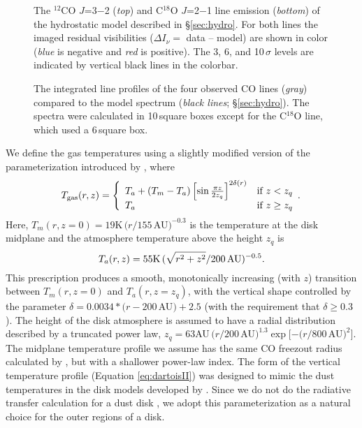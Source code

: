 \begin{figure}[t!]
\caption{The $^{12}$CO $J$=3$-$2 ({\it top}) and C$^{18}$O $J$=2$-$1 line 
emission ({\it bottom}) of the hydrostatic model described in \S\ref{sec:hydro}.
For both lines the imaged residual visibilities ($\Delta I_\nu=$ data -- model) 
are shown in color ({\it blue} is negative and {\it red} is positive). The 3, 6,
and 10\,$\sigma$ levels are indicated by vertical black lines in the colorbar.
\label{fig:hydrochmaps}}
\end{figure}

\begin{figure}[t!]
\caption{The integrated line profiles of the four observed CO lines 
({\it gray}) compared to the model spectrum ({\it black lines}; 
\S\ref{sec:hydro}).  The spectra were calculated in 10\arcsec\,square boxes 
except for the C$^{18}$O line, which used a 6\arcsec\,square box.
\label{fig:hydrolps}}
\end{figure}

We define the gas temperatures using a slightly modified version of the 
parameterization introduced by \citet{dartois03}, where
\begin{equation}
 T_{\rm gas}(r, z) = \left\{
\begin{array}{ll}
T_a + \left(T_m - T_a\right) \left[\sin{\frac{\pi z}{2 z_q}}\right]^{2\delta(r)} & \mbox{if $z < z_q$} \\
T_a & \mbox{if $z \ge z_q$} 
\end{array}.
\right. 
\label{eq:dartoisII}
\end{equation}
Here, $T_m(r,z=0) = 19$K\,$(r/155$\,AU$)^{-0.3}$ is the temperature at the disk 
midplane and the atmosphere temperature above the height $z_q$ is 
\begin{equation}
T_a(r, z) = 55{\rm K\,}(\sqrt{r^2 + z^2}/200{\rm \,AU})^{-0.5}.
\end{equation}
This prescription produces a smooth, monotonically increasing (with $z$) 
transition between $T_m(r,z=0)$ and $T_a(r,z=z_q)$, with the vertical shape 
controlled by the parameter $\delta = 0.0034*(r-200$\,AU$) + 2.5$ (with the 
requirement that $\delta \geq 0.3$).  The height of the disk atmosphere is 
assumed to have a radial distribution described by a truncated power law, 
$z_q = 63$AU\,$(r/200$\,AU$)^{1.3} \exp[-(r/800$\,AU$)^2]$.  The midplane 
temperature profile we assume has the same CO freezout radius calculated by 
\citet{qi11}, but with a shallower power-law index.  The form of the vertical 
temperature profile (Equation \ref{eq:dartoisII}) was designed to mimic the 
dust temperatures in the disk models developed by 
\citet{dalessio98,dalessio99,dalessio01,dalessio06}.  Since we do not do the 
radiative transfer calculation for a dust disk 
\citep[e.g.,][]{qi11,andrews12}, we adopt this parameterization as a natural 
choice for the outer regions of a disk.

